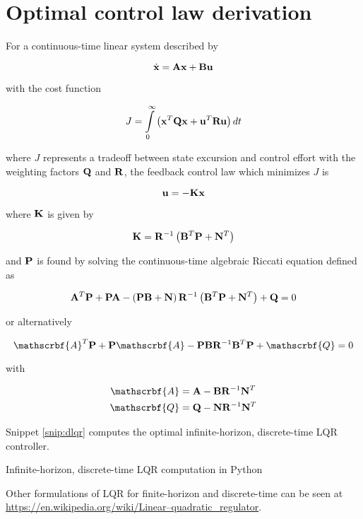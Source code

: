 \section{Optimal control law derivation}
\label{sec:app-optimal-control-law-deriv}

For a continuous-time linear system described by

\begin{equation}
  \dot{\mathbf{x}} = \mathbf{A}\mathbf{x} + \mathbf{B}\mathbf{u}
\end{equation}

with the cost function

\begin{equation*}
  J = \int\limits_0^\infty \left(\mathbf{x}^T\mathbf{Q}\mathbf{x} +
    \mathbf{u}^T\mathbf{R}\mathbf{u}\right) dt
\end{equation*}

where $J$ represents a tradeoff between \gls{state} excursion and control
effort with the weighting factors $\mathbf{Q}$ and $\mathbf{R}$, the feedback
\gls{control law} which minimizes $J$ is

\begin{equation*}
  \mathbf{u} = -\mathbf{K}\mathbf{x}
\end{equation*}

where $\mathbf{K}$ is given by

\begin{equation*}
  \mathbf{K} = \mathbf{R}^{-1} \left(\mathbf{B}^T\mathbf{P} + \mathbf{N}^T\right)
\end{equation*}

and $\mathbf{P}$ is found by solving the continuous-time algebraic Riccati equation
defined as

\begin{equation*}
  \mathbf{A}^T\mathbf{P} + \mathbf{P}\mathbf{A} - \left(\mathbf{P}\mathbf{B} +
    \mathbf{N}\right) \mathbf{R}^{-1} \left(\mathbf{B}^T\mathbf{P} + \mathbf{N}^T\right) +
    \mathbf{Q} = 0
\end{equation*}

or alternatively

\begin{equation*}
  \mathscrbf{A}^T\mtx{P} + \mtx{P}\mathscrbf{A} -
    \mtx{P}\mtx{B}\mtx{R}^{-1}\mtx{B}^T\mtx{P} + \mathscrbf{Q} = 0
\end{equation*}

with

\begin{align*}
  \mathscrbf{A} &= \mtx{A} - \mtx{B}\mtx{R}^{-1}\mtx{N}^T \\
  \mathscrbf{Q} &= \mtx{Q} - \mtx{N}\mtx{R}^{-1}\mtx{N}^T
\end{align*}

Snippet \ref{snip:dlqr} computes the optimal infinite-horizon, discrete-time
LQR controller.

\begin{snippet}
  \caption{Infinite-horizon, discrete-time LQR computation in Python}
  \label{snip:dlqr}
\end{snippet}

Other formulations of LQR for finite-horizon and discrete-time can be seen at
\url{https://en.wikipedia.org/wiki/Linear–quadratic_regulator}.
